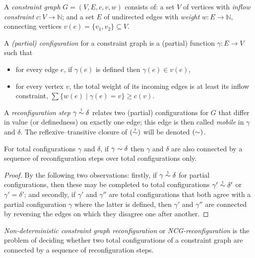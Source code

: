 \documentclass{sigplanconf-modified}
\let\capsabbrev=\uppercase
\begin{document}
\begin{definition} 
A \emph{constraint graph} $G=(V,E,c,v,w)$ consists of: a set $V$ of vertices with \emph{inflow constraint} $c\colon V\to\mathbb N$; and a set $E$ of undirected edges with \emph{weight} $w\colon E\to\mathbb N$, connecting vertices $v(e)=\{v_1,v_2\}\subseteq V$.

\smallskip

A \emph{(partial) configuration} for a constraint graph is a (partial) function $\gamma\colon E\to V$ such that
\begin{itemize}
	\item
for every edge $e$, if $\gamma(e)$ is defined then $\gamma(e)\in v(e)$,
	\item
for every vertex $v$, the total weight of its incoming edges is at least its inflow constraint, 
$\sum\{w(e)\mid\gamma(e)=v\}\geq c(v)$.
\end{itemize} 

\smallskip
A \emph{reconfiguration step} $\gamma\perm*\delta$ relates two (partial) configurations for $G$ that differ in value (or definedness) on exactly one edge; this edge is then called \emph{mobile} in $\gamma$ and $\delta$.
%
The reflexive--transitive closure of $(\perm*)$ will be denoted $(\perm)$.
%
\end{definition}


\begin{proposition}
\label{prop:partial simulates total reconfiguration}
For total configurations $\gamma$ and $\delta$, if $\gamma\perm\delta$ then $\gamma$ and $\delta$ are also connected by a sequence of reconfiguration steps over total configurations only.
\end{proposition}


\begin{proof}
By the following two observations: firstly, 
%
if $\gamma\perm*\delta$ for partial configurations, then these may be completed to total configurations $\gamma'\perm*\delta'$ or $\gamma'=\delta'$; and secondly,
%
if $\gamma'$ and $\gamma''$ are total configurations that both agree with a partial configuration $\gamma$ where the latter is defined, then $\gamma'$ and $\gamma''$ are connected by reversing the edges on which they disagree one after another.
%
\end{proof}


\emph{Non-deterministic constraint graph reconfiguration} or \emph{\capsabbrev{ncg}-reconfiguration} is the problem of deciding whether two total configurations of a constraint graph are connected by a sequence of reconfiguration steps.
%
\end{document}
